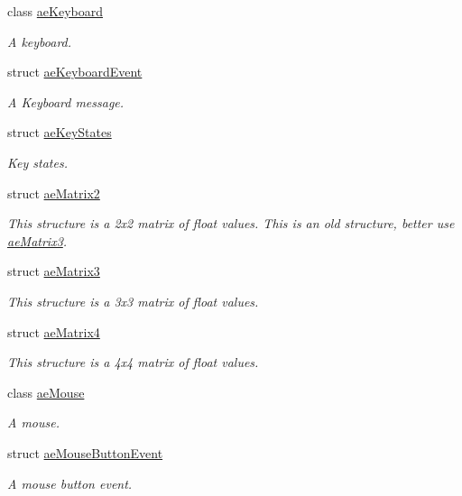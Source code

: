 \begin{DoxyCompactItemize}
class \hyperlink{classae_core_1_1ae_keyboard}{ae\+Keyboard}
\begin{DoxyCompactList}\small\item\em A keyboard. \end{DoxyCompactList}\item 
struct \hyperlink{structae_core_1_1ae_keyboard_event}{ae\+Keyboard\+Event}
\begin{DoxyCompactList}\small\item\em A Keyboard message. \end{DoxyCompactList}\item 
struct \hyperlink{structae_core_1_1ae_key_states}{ae\+Key\+States}
\begin{DoxyCompactList}\small\item\em Key states. \end{DoxyCompactList}\item 
struct \hyperlink{structae_core_1_1ae_matrix2}{ae\+Matrix2}
\begin{DoxyCompactList}\small\item\em This structure is a 2x2 matrix of float values. This is an old structure, better use \hyperlink{structae_core_1_1ae_matrix3}{ae\+Matrix3}. \end{DoxyCompactList}\item 
struct \hyperlink{structae_core_1_1ae_matrix3}{ae\+Matrix3}
\begin{DoxyCompactList}\small\item\em This structure is a 3x3 matrix of float values. \end{DoxyCompactList}\item 
struct \hyperlink{structae_core_1_1ae_matrix4}{ae\+Matrix4}
\begin{DoxyCompactList}\small\item\em This structure is a 4x4 matrix of float values. \end{DoxyCompactList}\item 
class \hyperlink{classae_core_1_1ae_mouse}{ae\+Mouse}
\begin{DoxyCompactList}\small\item\em A mouse. \end{DoxyCompactList}\item 
struct \hyperlink{structae_core_1_1ae_mouse_button_event}{ae\+Mouse\+Button\+Event}
\begin{DoxyCompactList}\small\item\em A mouse button event. \end{DoxyCompactList}\item 

\end{DoxyCompactItemize}
